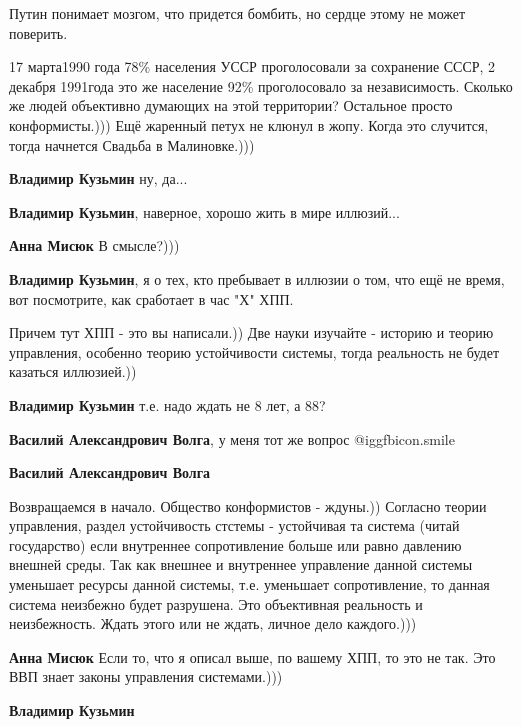 \begin{itemize}
Путин понимает мозгом, что придется бомбить, но сердце этому не может поверить.


17 марта1990 года 78\% населения УССР проголосовали за сохранение СССР, 2
декабря 1991года это же население 92\% проголосовало за независимость. Сколько
же людей объективно думающих на этой территории? Остальное просто
конформисты.))) Ещё жаренный петух не клюнул в жопу. Когда это случится, тогда
начнется Свадьба в Малиновке.)))

\begin{itemize} %
\textbf{Владимир Кузьмин} ну, да...

\textbf{Владимир Кузьмин}, наверное, хорошо жить в мире иллюзий...

\textbf{Анна Мисюк} В смысле?)))

\textbf{Владимир Кузьмин}, я о тех, кто пребывает в иллюзии о том, что ещё не время, вот посмотрите, как сработает в час "Х" ХПП.


Причем тут ХПП - это вы написали.)) Две науки изучайте - историю и теорию
управления, особенно теорию устойчивости системы, тогда реальность не будет
казаться иллюзией.))

\textbf{Владимир Кузьмин} т.е. надо ждать не 8 лет, а 88?

\textbf{Василий Александрович Волга}, у меня тот же вопрос  @igg{fbicon.smile} 

\textbf{Василий Александрович Волга} 

Возвращаемся в начало. Общество конформистов - ждуны.)) Согласно теории
управления, раздел устойчивость стстемы - устойчивая та система (читай
государство) если внутреннее сопротивление больше или равно давлению внешней
среды. Так как внешнее и внутреннее управление данной системы уменьшает ресурсы
данной системы, т.е. уменьшает сопротивление, то данная система неизбежно будет
разрушена. Это объективная реальность и неизбежность. Ждать этого или не ждать,
личное дело каждого.)))

\textbf{Анна Мисюк} Если то, что я описал выше, по вашему ХПП, то это не так. Это ВВП знает законы управления системами.)))

\textbf{Владимир Кузьмин} 


\end{itemize}
\end{itemize}

